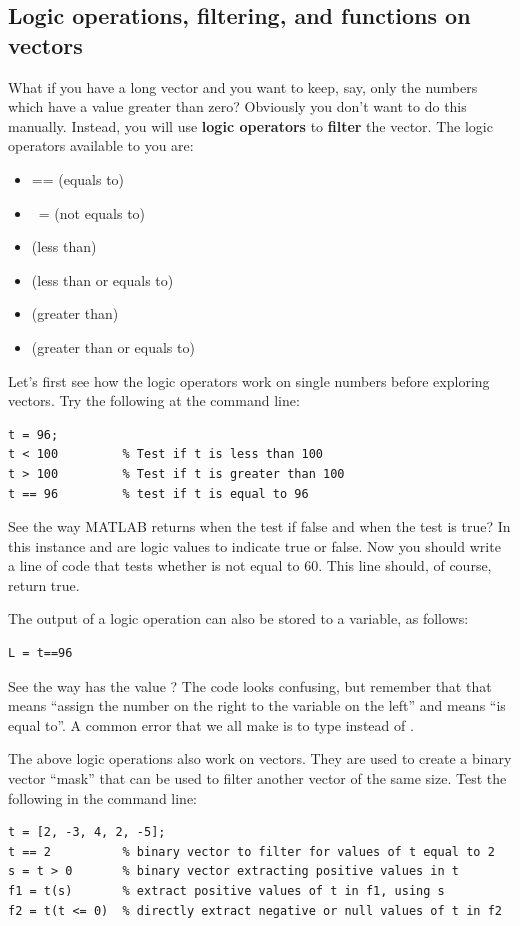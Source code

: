 \documentclass{article}
\begin{document}
\subsection{Logic operations, filtering, and functions on vectors}

What if you have a long vector and you want to keep, say, only the numbers which have a value greater than zero?
Obviously you don't want to do this manually. 
Instead, you will use \textbf{logic operators} to \textbf{filter} the vector. 
The logic operators available to you are:
\begin{itemize}
\item {==} (equals to)
\item {~=} (not equals to)
\item \mcode{<} (less than)
\item \mcode{<=} (less than or equals to)
\item \mcode{>} (greater than)
\item \mcode{>=} (greater than or equals to)
\end{itemize}

Let's first see how the logic operators work on single numbers before exploring vectors. 
Try the following at the command line:
\begin{lstlisting}
t = 96;
t < 100         % Test if t is less than 100
t > 100         % Test if t is greater than 100
t == 96         % test if t is equal to 96
\end{lstlisting}

See the way MATLAB returns  when the test if false and  when the test is true? 
In this instance  and  are logic values to indicate true or false. 
Now you should write a line of code that tests whether  is not equal to 60.
This line should, of course, return true.

The output of a logic operation can also be stored to a variable, as follows:

\begin{lstlisting}
L = t==96
\end{lstlisting}

See the way  has the value ?
The code looks confusing, but remember that that \mcode{=} means ``assign the number on the right to the variable on the left'' and \mcode{==} means ``is equal to''.
A common error that we all make is to type  instead of .

The above logic operations also work on vectors. 
They are used to create a binary vector ``mask'' that can be used to filter another vector of the same size.
Test the following in the command line:
\begin{lstlisting}
t = [2, -3, 4, 2, -5];
t == 2          % binary vector to filter for values of t equal to 2
s = t > 0       % binary vector extracting positive values in t
f1 = t(s)       % extract positive values of t in f1, using s
f2 = t(t <= 0)  % directly extract negative or null values of t in f2
\end{lstlisting}
\end{document}
